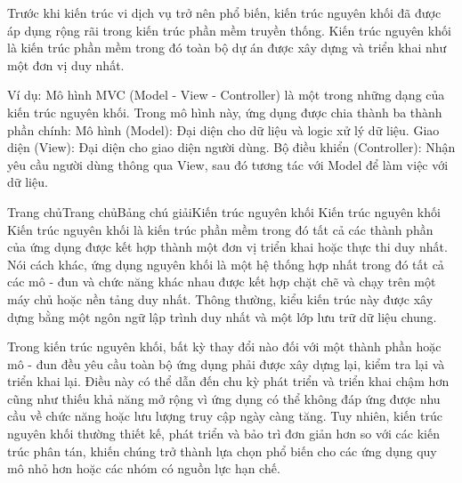 Trước khi kiến trúc vi dịch vụ trở nên phổ biến, kiến trúc nguyên khối đã được áp dụng rộng rãi trong kiến trúc phần mềm truyền thống. Kiến trúc nguyên khối là kiến trúc phần mềm trong đó toàn bộ dự án được xây dựng và triển khai như một đơn vị duy nhất.

Ví dụ: Mô hình MVC (Model - View - Controller) là một trong những dạng của kiến trúc nguyên khối.
Trong mô hình này, ứng dụng được chia thành ba thành phần chính:
Mô hình (Model): Đại diện cho dữ liệu và logic xử lý dữ liệu.
Giao diện (View): Đại diện cho giao diện người dùng.
Bộ điều khiển (Controller): Nhận yêu cầu người dùng thông qua View, sau đó tương tác với Model để làm việc với dữ liệu.

Trang chủTrang chủBảng chú giảiKiến trúc nguyên khối
Kiến trúc nguyên khối
Kiến trúc nguyên khối là kiến trúc phần mềm trong đó tất cả các thành phần của ứng dụng được kết hợp thành một đơn vị triển khai hoặc thực thi duy nhất. Nói cách khác, ứng dụng nguyên khối là một hệ thống hợp nhất trong đó tất cả các mô - đun và chức năng khác nhau được kết hợp chặt chẽ và chạy trên một máy chủ hoặc nền tảng duy nhất. Thông thường, kiểu kiến trúc này được xây dựng bằng một ngôn ngữ lập trình duy nhất và một lớp lưu trữ dữ liệu chung.

Trong kiến trúc nguyên khối, bất kỳ thay đổi nào đối với một thành phần hoặc mô - đun đều yêu cầu toàn bộ ứng dụng phải được xây dựng lại, kiểm tra lại và triển khai lại. Điều này có thể dẫn đến chu kỳ phát triển và triển khai chậm hơn cũng như thiếu khả năng mở rộng vì ứng dụng có thể không đáp ứng được nhu cầu về chức năng hoặc lưu lượng truy cập ngày càng tăng. Tuy nhiên, kiến trúc nguyên khối thường thiết kế, phát triển và bảo trì đơn giản hơn so với các kiến trúc phân tán, khiến chúng trở thành lựa chọn phổ biến cho các ứng dụng quy mô nhỏ hơn hoặc các nhóm có nguồn lực hạn chế.

